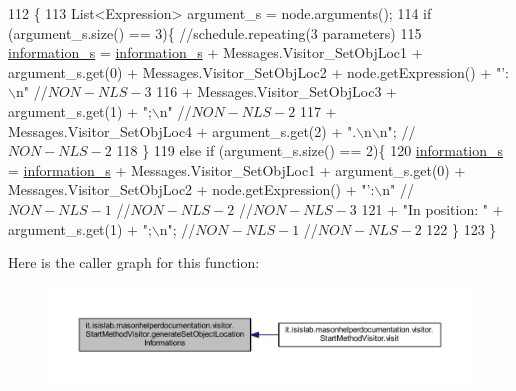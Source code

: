 \begin{DoxyCode}
112                                                                               \{
113         List<Expression> argument\_s = node.arguments();
114         \textcolor{keywordflow}{if} (argument\_s.size() == 3)\{    \textcolor{comment}{//schedule.repeating(3 parameters)}
115             \hyperlink{classit_1_1isislab_1_1masonhelperdocumentation_1_1visitor_1_1_start_method_visitor_a59b86134adb11f995ce96c1a96b51d50}{information\_s} = \hyperlink{classit_1_1isislab_1_1masonhelperdocumentation_1_1visitor_1_1_start_method_visitor_a59b86134adb11f995ce96c1a96b51d50}{information\_s} + Messages.Visitor\_SetObjLoc1 + 
      argument\_s.get(0) + Messages.Visitor\_SetObjLoc2 + node.getExpression() + \textcolor{stringliteral}{"': \(\backslash\)n"} \textcolor{comment}{//$NON-NLS-3$}
116                                 + Messages.Visitor\_SetObjLoc3 + argument\_s.get(1) + \textcolor{stringliteral}{";\(\backslash\)n"} \textcolor{comment}{//$NON-NLS-2$}
117                                 + Messages.Visitor\_SetObjLoc4 + argument\_s.get(2) + \textcolor{stringliteral}{".\(\backslash\)n\(\backslash\)n"}; \textcolor{comment}{//$NON-NLS-2$}
118         \}
119         \textcolor{keywordflow}{else} \textcolor{keywordflow}{if} (argument\_s.size() == 2)\{
120             \hyperlink{classit_1_1isislab_1_1masonhelperdocumentation_1_1visitor_1_1_start_method_visitor_a59b86134adb11f995ce96c1a96b51d50}{information\_s} = \hyperlink{classit_1_1isislab_1_1masonhelperdocumentation_1_1visitor_1_1_start_method_visitor_a59b86134adb11f995ce96c1a96b51d50}{information\_s} + Messages.Visitor\_SetObjLoc1 + 
      argument\_s.get(0) + Messages.Visitor\_SetObjLoc2 + node.getExpression() + \textcolor{stringliteral}{"':\(\backslash\)n"} \textcolor{comment}{//$NON-NLS-1$ //$NON-NLS-2$
       //$NON-NLS-3$}
121                     + \textcolor{stringliteral}{"In position: "} + argument\_s.get(1) + \textcolor{stringliteral}{";\(\backslash\)n"}; \textcolor{comment}{//$NON-NLS-1$ //$NON-NLS-2$}
122         \}
123     \}
\end{DoxyCode}


Here is the caller graph for this function\-:
\nopagebreak
\begin{figure}[H]
\begin{center}
\leavevmode
\includegraphics[width=350pt]{classit_1_1isislab_1_1masonhelperdocumentation_1_1visitor_1_1_start_method_visitor_a09299758d8f3ce54b04db73271dde0da_icgraph}
\end{center}
\end{figure}


